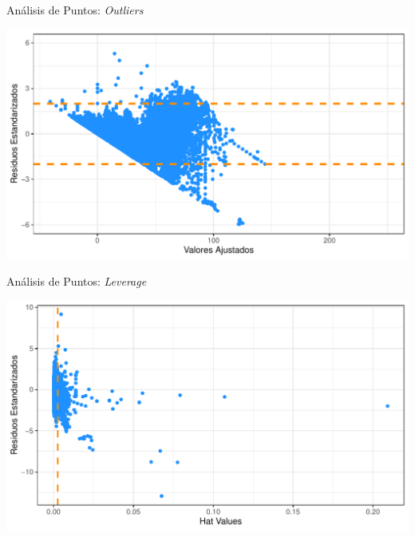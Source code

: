 \documentclass[11pt]{beamer}\usepackage{knitr}
\begin{document}
\begin{frame}[fragile]{Análisis de Puntos: \textit{Outliers}}

\begin{knitrout}\footnotesize
{}\color{fgcolor}

{\centering \includegraphics[width=\maxwidth]{figure/unnamed-chunk-4-1} 

}



\end{knitrout}


\end{frame}

\begin{frame}[fragile]{Análisis de Puntos: \textit{Leverage}}

\begin{knitrout}\footnotesize
{}\color{fgcolor}

{\centering \includegraphics[width=\maxwidth]{figure/unnamed-chunk-5-1} 

}



\end{knitrout}


\end{frame}
\end{document}
